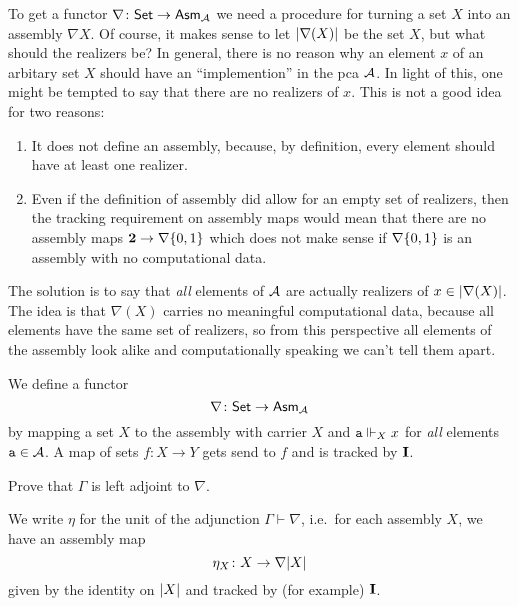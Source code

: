 To get a functor \(\nabla \colon \Set \to \Asm{\AA}\) we need a procedure for
turning a set \(X\) into an assembly \(\nabla X\).
%
Of course, it makes sense to let \(\carrier{\nabla(X)}\) be the set \(X\), but
what should the realizers be?
%
In general, there is no reason why an element \(x\) of an arbitary set \(X\)
should have an ``implemention'' in the pca \(\AA\).
%
In light of this, one might be tempted to say that there are no realizers of
\(x\). This is not a good idea for two reasons:
\begin{enumerate}[(1)]
\item It does not define an assembly, because, by definition, every element should
  have at least one realizer.
\item Even if the definition of assembly did allow for an empty set of
  realizers, then the tracking requirement on assembly maps would mean that
  there are no assembly maps \(\Two \to \nabla\set{0,1}\) which does not make
  sense if \(\nabla\set{0,1}\) is an assembly with no computational data.
\end{enumerate}

The solution is to say that \emph{all} elements of \(\AA\) are actually realizers
of \(x \in \carrier{\nabla(X)}\).
%
The idea is that \(\nabla(X)\) carries no meaningful computational data, because
all elements have the same set of realizers, so from this perspective all
elements of the assembly look alike and computationally speaking we can't tell
them apart.


\begin{definition}[\(\nabla\)]
  We define a functor
  \[
    \nabla \colon \Set \to \Asm{\AA}
  \]
  by mapping a set \(X\) to the assembly with carrier \(X\) and
  \(\pca{a} \realizes_X x\) for \emph{all} elements \(\pca{a} \in \AA\).
  A map of sets \(f \colon X \to Y\) gets send to \(f\) and is tracked by
  \(\icomb\).
\end{definition}

\begin{exercise}\label{exer:Gamma-left-adjoint-to-nabla}
  Prove that \(\Gamma\) is left adjoint to \(\nabla\).
\end{exercise}

\begin{notation}[\(\eta\)]
  We write \(\eta\) for the unit of the adjunction \(\Gamma \vdash \nabla\),
  i.e.\ for each assembly \(X\), we have an assembly map
  \[
    \eta_X \colon X \to \nabla \carrier{X}
  \]
  given by the identity on \(\carrier{X}\) and tracked by (for example)
  \(\icomb\).
\end{notation}

